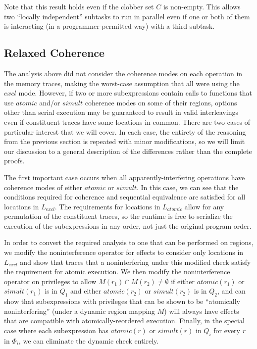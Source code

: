 Note that this result holds even if the clobber set $C$ is non-empty.  This allows 
two ``locally independent'' subtasks to run in parallel even if one or both
of them is interacting (in a programmer-permitted way) with a third subtask.

\subsection{Relaxed Coherence}

The analysis above did not consider the coherence modes on each operation in the memory traces,
making the worst-case assumption that all were using the $excl$ mode.  However, if two or more
subexpressions contain calls to functions that use $atomic$ and/or $simult$ coherence modes
on some of their regions, options other than serial execution may be guaranteed to 
result in valid interleavings even if constituent traces have some locations in common.  There
are two cases of particular interest that we will cover.  In each case, the entirety of the 
reasoning from the previous section is repeated with minor modifications, so we will limit our
discussion to a general description of the differences rather than the complete proofs.

The first important case occurs when all apparently-interfering operations have coherence modes
of either $atomic$ or $simult$.  In this case, we can see that the conditions required for
coherence and sequential equivalence are satisfied for all locations in $L_{excl}$.  The
requirements for locations in $L_{atomic}$ allow for any permutation of the constituent traces,
so the runtime is free to serialize the execution of the subexpressions in any order, not just
the original program order.

In order to convert the required analysis to one that can be performed on regions, we modify
the noninterference operator for effects to consider only locations in $L_{excl}$ and show that
traces that a noninterfering under this modified check satisfy the requirement for atomic
execution.  We then modify the noninterference operator on privileges to allow 
$M(r_1) \cap M(r_2) \not= \emptyset$ if either $atomic(r_1)$ or $simult(r_1)$ is in $Q_1$ and
either $atomic(r_2)$ or $simult(r_2)$ is in $Q_2$, and can show that subexpressions with 
privileges that can be shown to be ``atomically noninterfering'' (under a dynamic region mapping
$M$) will always have effects that are compatible with atomically-reordered execution.  Finally,
in the special case where each subexpression has $atomic(r)$ or $simult(r)$ in $Q_i$ for every $r$
in $\Phi_i$, we can eliminate the dynamic check entirely.

